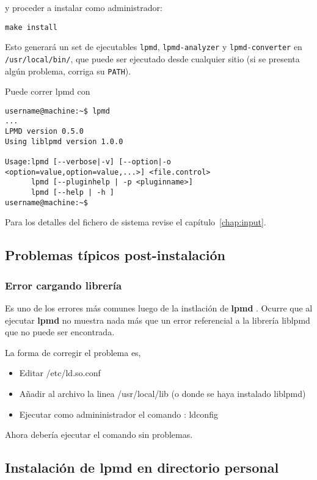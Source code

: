 \documentclass[a4paper,10pt]{scrbook}
\newcommand{\lpmd}{\textbf{lpmd }}
\newcommand{\control}[1]{\begin{center}\begin{minipage}{10cm}\texttt{#1}\end{minipage}\end{center}}
\begin{document}
y proceder a instalar como administrador:

\control{make install}

Esto generar\'a un set de ejecutables \verb|lpmd|, \verb|lpmd-analyzer| y \verb|lpmd-converter| en \verb|/usr/local/bin/|, que puede ser ejecutado desde cualquier sitio (si se presenta alg\'un problema, corriga su \verb|PATH|).

Puede correr lpmd con

\begin{verbatim}
username@machine:~$ lpmd
...
LPMD version 0.5.0
Using liblpmd version 1.0.0

Usage:lpmd [--verbose|-v] [--option|-o <option=value,option=value,...>] <file.control>
      lpmd [--pluginhelp | -p <pluginname>]
      lpmd [--help | -h ]
username@machine:~$
\end{verbatim}

Para los detalles del fichero de sistema revise el cap\'itulo~\ref{chap:input}.

\subsection{Problemas t\'ipicos post-instalaci\'on}

\subsubsection{Error cargando librer\'ia}

Es uno de los errores m\'as comunes luego de la instlaci\'on de \lpmd. Ocurre que al ejecutar \lpmd no muestra nada m\'as que un error referencial a la librer\'ia liblpmd que no puede ser encontrada.

La forma de corregir el problema es,

\begin{itemize}
 \item Editar /etc/ld.so.conf
 \item A\~nadir al archivo la linea /usr/local/lib (o donde se haya instalado liblpmd)
 \item Ejecutar como admininistrador el comando : ldconfig
\end{itemize}

Ahora deber\'ia ejecutar el comando sin problemas.

\subsection{Instalaci\'on de lpmd en directorio personal}
\end{document}
